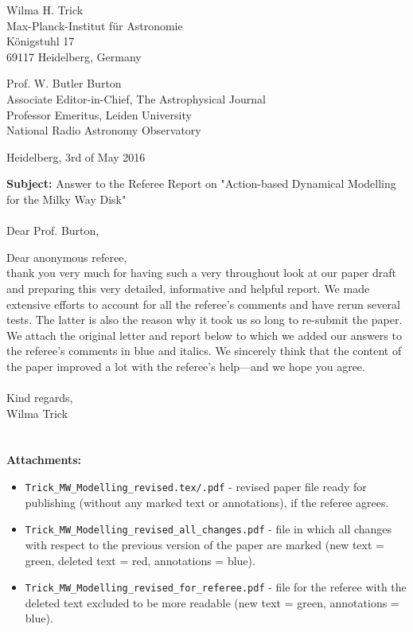 \documentclass[10pt,a4paper]{article}
\begin{document}
\begin{flushright}
Wilma H. Trick\\
Max-Planck-Institut f\"{u}r Astronomie\\
K\"{o}nigstuhl 17\\
69117 Heidelberg, Germany
\end{flushright}

\noindent Prof. W. Butler Burton\\
Associate Editor-in-Chief, The Astrophysical Journal\\
Professor Emeritus, Leiden University\\
National Radio Astronomy Observatory\\

\begin{flushright}
Heidelberg, 3rd of May 2016
\end{flushright}

\textbf{Subject:} Answer to the Referee Report on "Action-based Dynamical Modelling for the Milky Way Disk"\\\\

Dear Prof. Burton,

Dear anonymous referee,\\

thank you very much for having such a very throughout look at our paper draft and preparing this very detailed, informative and helpful report. We made extensive efforts to account for all the referee's comments and have rerun several tests. The latter is also the reason why it took us so long to re-submit the paper. We attach the original letter and report below to which we added our answers to the referee's comments in blue and italics. We sincerely think that the content of the paper improved a lot with the referee's help---and we hope you agree.\\\\
Kind regards,\\
Wilma Trick\\\\\\

\noindent\textbf{Attachments:}
\begin{itemize}
\item \texttt{Trick{\_}MW{\_}Modelling{\_}revised.tex/.pdf} - revised paper file ready for publishing (without any marked text or annotations), if the referee agrees.
\item \texttt{Trick{\_}MW{\_}Modelling{\_}revised{\_}all{\_}changes.pdf} - file in which all changes with respect to the previous version of the paper are marked (new text = green, deleted text = red, annotations = blue).
\item \texttt{Trick{\_}MW{\_}Modelling{\_}revised{\_}for{\_}referee.pdf} - file for the referee with the deleted text excluded to be more readable (new text = green, annotations = blue).
\end{itemize}
\end{document}

